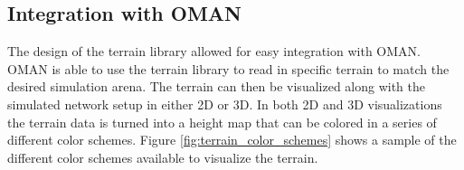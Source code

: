 \subsection{Integration with OMAN}
The design of the terrain library allowed for easy integration with OMAN.  OMAN is able to use the terrain library to read in specific terrain to match the desired simulation arena.  The terrain can then be visualized along with the simulated network setup in either 2D or 3D.  In both 2D and 3D visualizations the terrain data is turned into a height map that can be colored in a series of different color schemes.  Figure \ref{fig:terrain_color_schemes} shows a sample of the different color schemes available to visualize the terrain.  

\begin{figure}[ht]
\centering


\end{figure}
